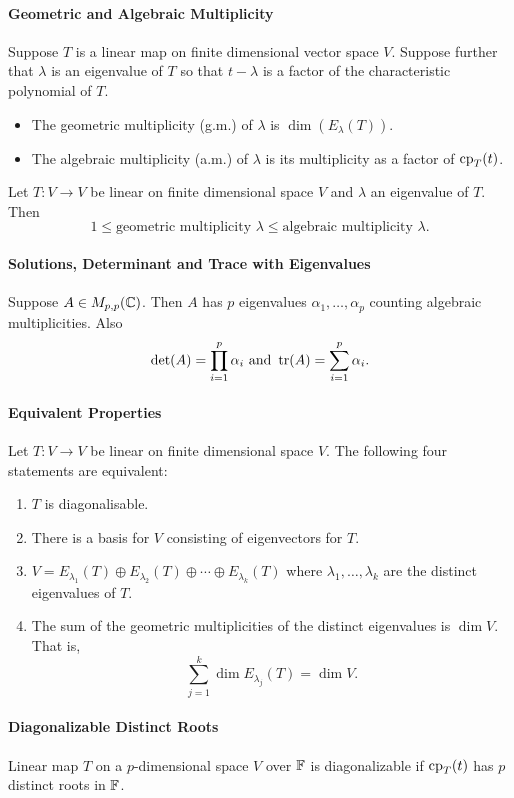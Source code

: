 \paragraph{Geometric and Algebraic Multiplicity}
Suppose \(T\) is a linear map on finite dimensional vector space \(V\). Suppose further that \(\lambda\) is an eigenvalue of \(T\) so that \(t - \lambda\) is a factor of the characteristic polynomial of \(T\). 
\begin{itemize}
    \item The geometric multiplicity (g.m.) of \(\lambda\) is \(\dim(E_\lambda(T))\).
    \item The algebraic multiplicity (a.m.) of \(\lambda\) is its multiplicity as a factor of \(\mathrm{cp}_T(t)\).
\end{itemize}
Let \(T: V \to V\) be linear on finite dimensional space \(V\) and \(\lambda\) an eigenvalue of \(T\). Then
\[1 \leq \text{geometric multiplicity } \lambda \leq \text{algebraic multiplicity } \lambda.\]

\paragraph{Solutions, Determinant and Trace with Eigenvalues}
Suppose \(A \in M_{p,p}(\mathbb{C})\). Then \(A\) has \(p\) eigenvalues \(\alpha_1, \dots, \alpha_p\) counting algebraic multiplicities. Also
\[\det(A) = \prod_{i=1}^p \alpha_i \text{ and } \tr(A) = \sum_{i=1}^p \alpha_i.\]

\paragraph{Equivalent Properties}
Let \(T: V \to V\) be linear on finite dimensional space \(V\). The following four statements are equivalent:
\begin{enumerate}
    \item \(T\) is diagonalisable.
    \item There is a basis for \(V\) consisting of eigenvectors for \(T\).
    \item \(V = E_{\lambda_1}(T) \oplus E_{\lambda_2}(T) \oplus \cdots \oplus E_{\lambda_k}(T)\) where \(\lambda_1, \dots, \lambda_k\) are the distinct eigenvalues of \(T\).
    \item The sum of the geometric multiplicities of the distinct eigenvalues is \(\dim V\). That is,
    \[\sum_{j=1}^k \dim E_{\lambda_j}(T) = \dim V.\]
\end{enumerate}

\paragraph{Diagonalizable Distinct Roots}
Linear map \(T\) on a \(p\)-dimensional space \(V\) over \(\mathbb{F}\) is diagonalizable if \(\mathrm{cp}_T(t)\) has \(p\) distinct roots in \(\mathbb{F}\).

